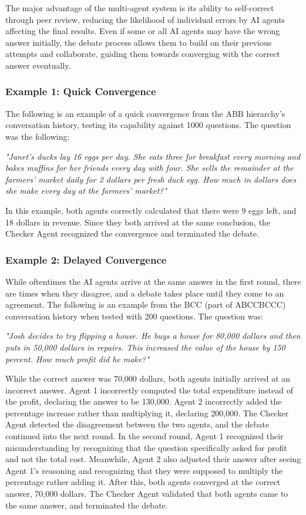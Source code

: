 The major advantage of the multi-agent system is its ability to self-correct through peer review, reducing the likelihood of individual errors by AI agents affecting the final results. Even if some or all AI agents may have the wrong answer initially, the debate process allows them to build on their previous attempts and collaborate, guiding them towards converging with the correct answer eventually.

\subsubsection{Example 1: Quick Convergence}
The following is an example of a quick convergence from the ABB hierarchy's conversation history, testing its capability against 1000 questions. The question was the following:

\textit{"Janet’s ducks lay 16 eggs per day. She eats three for breakfast every morning and bakes muffins for her friends every day with four. She sells the remainder at the farmers' market daily for 2 dollars per fresh duck egg. How much in dollars does she make every day at the farmers' market?"}

In this example, both agents correctly calculated that there were 9 eggs left, and 18 dollars in revenue. Since they both arrived at the same conclusion, the Checker Agent recognized the convergence and terminated the debate.

\subsubsection{Example 2: Delayed Convergence}
While oftentimes the AI agents arrive at the same answer in the first round, there are times when they disagree, and a debate takes place until they come to an agreement. The following is an example from the BCC (part of ABCCBCCC) conversation history when tested with 200 questions. The question was:

\textit{"Josh decides to try flipping a house. He buys a house for 80,000 dollars and then puts in 50,000 dollars in repairs. This increased the value of the house by 150 percent. How much profit did he make?"}

While the correct answer was 70,000 dollars, both agents initially arrived at an incorrect answer. Agent 1 incorrectly computed the total expenditure instead of the profit, declaring the answer to be 130,000. Agent 2 incorrectly added the percentage increase rather than multiplying it, declaring 200,000. The Checker Agent detected the disagreement between the two agents, and the debate continued into the next round. In the second round, Agent 1 recognized their misunderstanding by recognizing that the question specifically asked for profit and not the total cost. Meanwhile, Agent 2 also adjusted their answer after seeing Agent 1's reasoning and recognizing that they were supposed to multiply the percentage rather adding it. After this, both agents converged at the correct answer, 70,000 dollars. The Checker Agent validated that both agents came to the same answer, and terminated the debate.

